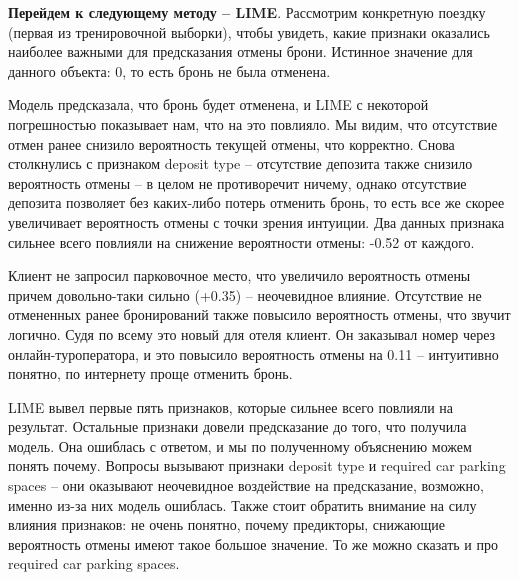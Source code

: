 \textbf{Перейдем к следующему методу -- LIME}. Рассмотрим конкретную поездку (первая из тренировочной выборки), чтобы увидеть, какие признаки оказались наиболее важными для предсказания отмены брони. Истинное значение для данного объекта: 0, то есть бронь не была отменена. 

\vspace{-2mm}
\begin{figure}[h]
\end{figure}
\vspace{-2mm}

Модель предсказала, что бронь будет отменена, и LIME с некоторой погрешностью показывает нам, что на это повлияло. Мы видим, что отсутствие отмен ранее снизило вероятность текущей отмены, что корректно. Снова столкнулись с признаком deposit type -- отсутствие депозита также снизило вероятность отмены -- в целом не противоречит ничему, однако отсутствие депозита позволяет без каких-либо потерь отменить бронь, то есть все же скорее увеличивает вероятность отмены с точки зрения интуиции. Два данных признака сильнее всего повлияли на снижение вероятности отмены: -0.52 от каждого.

Клиент не запросил парковочное место, что увеличило вероятность отмены причем довольно-таки сильно (+0.35) -- неочевидное влияние. Отсутствие не отмененных ранее бронирований также повысило вероятность отмены, что звучит логично. Судя по всему это новый для отеля клиент. Он заказывал номер через онлайн-туроператора, и это повысило вероятность отмены на 0.11 -- интуитивно понятно, по интернету проще отменить бронь.

LIME вывел первые пять признаков, которые сильнее всего повлияли на результат. Остальные признаки довели предсказание до того, что получила модель. Она ошиблась с ответом, и мы по полученному объяснению можем понять почему. Вопросы вызывают признаки deposit type и required car parking spaces -- они оказывают неочевидное воздействие на предсказание, возможно, именно из-за них модель ошиблась. Также стоит обратить внимание на силу влияния признаков: не очень понятно, почему предикторы, снижающие вероятность отмены имеют такое большое значение. То же можно сказать и про required car parking spaces.

